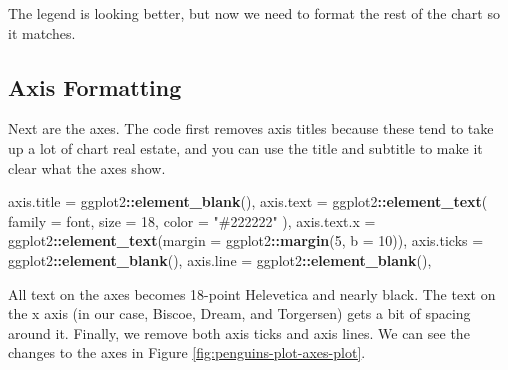 \documentclass[
]{book}
\newenvironment{Shaded}{\begin{snugshade}}{\end{snugshade}}
\newcommand{\AttributeTok}[1]{\textcolor[rgb]{0.13,0.29,0.53}{#1}}
\newcommand{\DecValTok}[1]{\textcolor[rgb]{0.00,0.00,0.81}{#1}}
\newcommand{\FunctionTok}[1]{\textcolor[rgb]{0.13,0.29,0.53}{\textbf{#1}}}
\newcommand{\NormalTok}[1]{#1}
\newcommand{\OtherTok}[1]{\textcolor[rgb]{0.56,0.35,0.01}{#1}}
\newcommand{\SpecialCharTok}[1]{\textcolor[rgb]{0.81,0.36,0.00}{\textbf{#1}}}
\newcommand{\StringTok}[1]{\textcolor[rgb]{0.31,0.60,0.02}{#1}}
\begin{document}
The legend is looking better, but now we need to format the rest of the chart so it matches.

\hypertarget{axis-formatting}{%
\subsection*{Axis Formatting}\label{axis-formatting}}

Next are the axes. The code first removes axis titles because these tend to take up a lot of chart real estate, and you can use the title and subtitle to make it clear what the axes show.

\begin{Shaded}
\begin{Highlighting}[]
\NormalTok{axis.title }\OtherTok{=}\NormalTok{ ggplot2}\SpecialCharTok{::}\FunctionTok{element\_blank}\NormalTok{(),}
\NormalTok{axis.text }\OtherTok{=}\NormalTok{ ggplot2}\SpecialCharTok{::}\FunctionTok{element\_text}\NormalTok{(}
  \AttributeTok{family =}\NormalTok{ font,}
  \AttributeTok{size =} \DecValTok{18}\NormalTok{,}
  \AttributeTok{color =} \StringTok{"\#222222"}
\NormalTok{),}
\NormalTok{axis.text.x }\OtherTok{=}\NormalTok{ ggplot2}\SpecialCharTok{::}\FunctionTok{element\_text}\NormalTok{(}\AttributeTok{margin =}\NormalTok{ ggplot2}\SpecialCharTok{::}\FunctionTok{margin}\NormalTok{(}\DecValTok{5}\NormalTok{, }\AttributeTok{b =} \DecValTok{10}\NormalTok{)),}
\NormalTok{axis.ticks }\OtherTok{=}\NormalTok{ ggplot2}\SpecialCharTok{::}\FunctionTok{element\_blank}\NormalTok{(),}
\NormalTok{axis.line }\OtherTok{=}\NormalTok{ ggplot2}\SpecialCharTok{::}\FunctionTok{element\_blank}\NormalTok{(),}
\end{Highlighting}
\end{Shaded}

All text on the axes becomes 18-point Helevetica and nearly black. The text on the x axis (in our case, Biscoe, Dream, and Torgersen) gets a bit of spacing around it. Finally, we remove both axis ticks and axis lines. We can see the changes to the axes in Figure \ref{fig:penguins-plot-axes-plot}.
\end{document}
